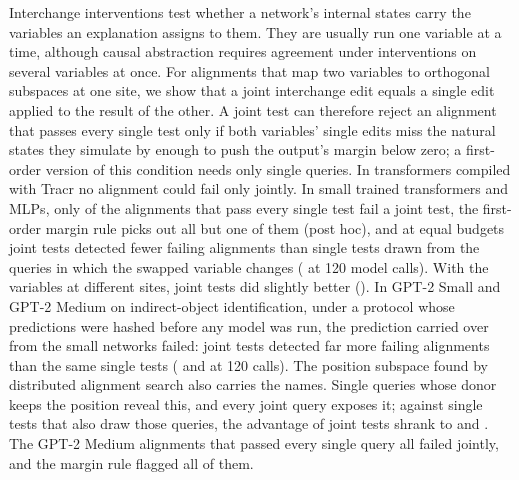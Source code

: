 Interchange interventions test whether a network's internal states carry the variables an explanation assigns to
them. They are usually run one variable at a time, although causal abstraction requires agreement under
interventions on several variables at once. For alignments that map two variables to orthogonal subspaces at one
site, we show that a joint interchange edit equals a single edit applied to the result of the other. A joint test
can therefore reject an alignment that passes every single test only if both variables' single edits miss the natural
states they simulate by enough to push the output's margin below zero; a first-order version of this condition needs
only single queries. In transformers compiled with Tracr no alignment could fail only jointly. In small trained
transformers and MLPs, only \TrnPerfectJointFailWord{} of the \TrnPerfect{} alignments that pass every single test fail a
joint test, the first-order margin rule picks out all but one of them (post hoc), and at equal budgets joint tests
detected fewer failing alignments than single tests drawn from the queries in which the swapped variable changes
(\TrnContrastOneTwenty{} at 120 model calls). With the variables at different sites, joint tests did slightly better
(\MsContrast). In GPT-2 Small and GPT-2 Medium on indirect-object identification, under a protocol whose predictions
were hashed before any model was run, the prediction carried over from the small networks failed: joint tests detected
far more failing alignments than the same single tests (\ContrastS{} and \ContrastM{} at 120 calls). The position
subspace found by distributed alignment search also carries the names. Single queries whose donor keeps the position
reveal this, and every joint query exposes it; against single tests that also draw those queries, the advantage of
joint tests shrank to \ContrastAllS{} and \ContrastAllM. The \PerfectWordM{} GPT-2 Medium alignments that passed every
single query all failed jointly, and the margin rule flagged all of them.
